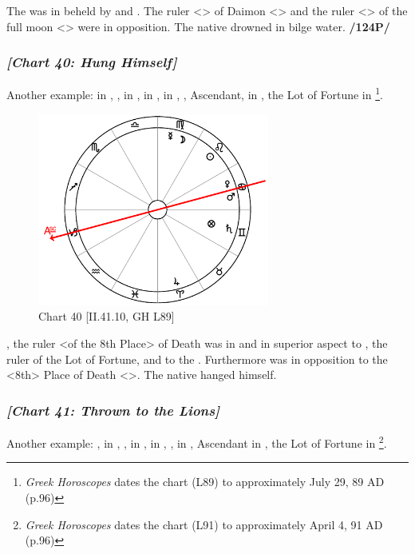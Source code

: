 The \Moon\xspace was in \Pisces\xspace beheld by \Saturn\xspace and \Mars. The ruler <\Moon> of Daimon <\Cancer> and the ruler <\Mars> of the full moon <\Scorpio> were in opposition. The native drowned in bilge water. \textbf{/124P/} 
\newpage
\subsubsection{\textit{[Chart 40: Hung Himself]}}
Another example: \Sun\xspace in \Leo, \Moon, \Mercury\xspace in \Virgo, \Saturn\xspace in \Gemini, \Jupiter\xspace in \Aries, \Mars, Ascendant, \Venus\xspace in \Cancer, the Lot of Fortune in \Gemini
\footnote{\textit{Greek Horoscopes} dates the chart (L89) to approximately July 29, 89 AD (p.96)}. 

\clearpage
\begin{figure}
\centering
\vspace{-20pt}
\includegraphics[width=0.68\textwidth]{charts/2_41_10}
\caption{Chart 40 [II.41.10, GH L89]}
\label{fig:chart40}
\end{figure} 

\noindent\Saturn, the ruler <of the 8th Place> of Death was in \Gemini\xspace and in superior aspect to \Mercury, the ruler of the Lot of Fortune, and to the \Moon. Furthermore \Mars\xspace was in opposition to the <8th> Place of Death <\Capricorn>. The native hanged himself.
\newpage
\subsubsection{\textit{[Chart 41: Thrown to the Lions]}}
Another example: \Sun, \Mercury\xspace in \Aries, \Moon, \Venus\xspace in \Pisces, \Saturn\xspace in \Cancer, \Jupiter, \Mars\xspace in \Taurus, Ascendant in \Scorpio, the Lot of Fortune in \Sagittarius
\footnote{\textit{Greek Horoscopes} dates the chart (L91) to approximately April 4, 91 AD (p.96)}. 

